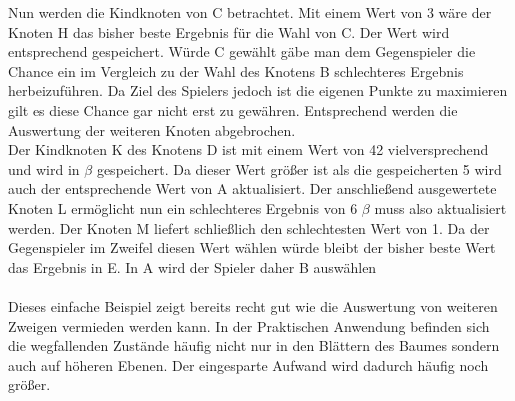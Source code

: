 Nun werden die Kindknoten von C betrachtet. Mit einem Wert von 3 wäre der Knoten H das bisher beste Ergebnis für die Wahl von C. Der Wert wird entsprechend gespeichert. Würde C gewählt gäbe man dem Gegenspieler die Chance ein im Vergleich zu der Wahl des Knotens B schlechteres Ergebnis herbeizuführen. Da Ziel des Spielers jedoch ist die eigenen Punkte zu maximieren gilt es diese Chance gar nicht erst zu gewähren. Entsprechend werden die Auswertung der weiteren Knoten abgebrochen.\\
Der Kindknoten K des Knotens D ist mit einem Wert von 42 vielversprechend und wird in $\beta$ gespeichert. Da dieser Wert größer ist als die gespeicherten 5 wird auch der entsprechende Wert von A aktualisiert. Der anschließend ausgewertete Knoten L ermöglicht nun ein schlechteres Ergebnis von 6 $\beta$ muss also aktualisiert werden. Der Knoten M liefert schließlich den schlechtesten Wert von 1. Da der Gegenspieler im Zweifel diesen Wert wählen würde bleibt der bisher beste Wert das Ergebnis in E. In A wird der Spieler daher B auswählen
\paragraph{}  
Dieses einfache Beispiel zeigt bereits recht gut wie die Auswertung von weiteren Zweigen vermieden werden kann. In der Praktischen Anwendung befinden sich die wegfallenden Zustände häufig nicht nur in den Blättern des Baumes sondern auch auf höheren Ebenen. Der eingesparte Aufwand wird dadurch häufig noch größer.  

